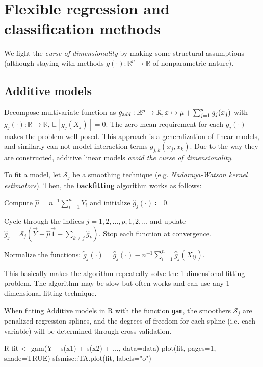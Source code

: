 \section{Flexible regression and classification methods}\label{sec:flexible_regression_and_classification_methods}
We fight the \emph{curse of dimensionality} by making some structural assumptions (although staying with methods $g(\cdot): \mathbb{R}^p \to \mathbb{R}$ of nonparametric nature).
\subsection{Additive models}%
\label{sub:additive_models}
\begin{sectionbox}\nospacing{}
  Decompose multivariate function as $g_{\textrm add}: \mathbb{R}^p\to\mathbb{R}, x\mapsto \mu + \sum_{j=1}^pg_j(x_j)$ with $g_j(\cdot): \mathbb{R}\to\mathbb{R}$, $\mathbb{E}[g_j(X_j)]=0$.
  The zero-mean requirement for each $g_j(\cdot)$ makes the problem well posed.
  This approach is a generalization of linear models, and similarly can not model interaction terms $g_{j,k}(x_j, x_k)$.
  Due to the way they are constructed, additive linear models \emph{avoid the curse of dimensionality}.
\end{sectionbox}
\begin{sectionbox}\nospacing{}
  To fit a model, let $\mathcal{S}_j$ be a smoothing technique (e.g. \emph{Nadaraya-Watson kernel estimators}).
  Then, the \textbf{backfitting} algorithm works as follows:
  \begin{itemizenosep}
    \item Compute $\hat \mu = n^{-1}\sum_{i=1}^n Y_i$ and initialize $\hat g_j(\cdot) \coloneqq 0$.
    \item Cycle through the indices $j = 1,2,\dots,p,1,2,\dots$ and update
      $\hat g_j=\mathcal{S}_j(\vec{Y}-\hat \mu\vec{1}-\sum_{k\neq j}\hat g_k)$.
      Stop each function at convergence.
    \item Normalize the functions: $\tilde g_j(\cdot) = \hat g_j(\cdot) - n^{-1}\sum_{i=1}^n\hat g_j(X_{ij})$.
  \end{itemizenosep}
  This basically makes the algorithm repeatedly solve the 1-dimensional fitting problem.
  The algorithm may be slow but often works and can use any 1-dimensional fitting technique.
\end{sectionbox}
\begin{sectionbox}\nospacing{}
  When fitting Additive models in R with the function \verb!gam!, the smoothers $\mathcal{S}_j$ are penalized regression splines, and the degrees of freedom for each spline (i.e. each variable) will be determined through cross-validation.

  \begin{mintlinebox}{R}
    fit <- gam(Y ~ s(x1) + s(x2) + ..., data=data)
    plot(fit, pages=1, shade=TRUE)
    sfsmisc::TA.plot(fit, labels="o")
  \end{mintlinebox}
\end{sectionbox}

